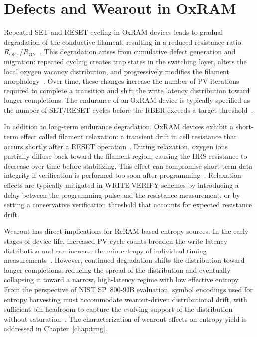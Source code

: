 \section{Defects and Wearout in OxRAM}
\label{sec:bg-defects}

Repeated SET and RESET cycling in OxRAM devices leads to gradual
degradation of the conductive filament, resulting in a reduced
resistance ratio $R_\text{OFF}/R_\text{ON}$~\cite{chen2011physical,
	hayakawa2017resolving}. This degradation arises from cumulative defect
generation and migration: repeated cycling creates trap states in the
switching layer, alters the local oxygen vacancy distribution, and
progressively modifies the filament morphology~\cite{chen2011physical}.
Over time, these changes increase the number of PV iterations required
to complete a transition and shift the write latency distribution toward
longer completions. The endurance of an OxRAM device is typically
specified as the number of SET/RESET cycles before the RBER exceeds a
target threshold~\cite{hayakawa2017resolving,
	fukuyama2019comprehensive}.

In addition to long-term endurance degradation, OxRAM devices exhibit a
short-term effect called filament relaxation: a transient drift in cell
resistance that occurs shortly after a RESET
operation~\cite{li2016short}. During relaxation, oxygen ions partially
diffuse back toward the filament region, causing the HRS resistance to
decrease over time before stabilizing. This effect can compromise
short-term data integrity if verification is performed too soon after
programming~\cite{li2016short}. Relaxation effects are typically
mitigated in WRITE-VERIFY schemes by introducing a delay between the
programming pulse and the resistance measurement, or by setting a
conservative verification threshold that accounts for expected
resistance drift.

Wearout has direct implications for ReRAM-based entropy sources. In the
early stages of device life, increased PV cycle counts broaden the write
latency distribution and can increase the min-entropy of individual
timing measurements~\cite{fukuyama2019comprehensive}. However, continued
degradation shifts the distribution toward longer completions, reducing
the spread of the distribution and eventually collapsing it toward a
narrow, high-latency regime with low effective entropy. From the
perspective of NIST SP~800-90B evaluation, symbol encodings used for
entropy harvesting must accommodate wearout-driven distributional drift,
with sufficient bin headroom to capture the evolving support of the
distribution without saturation~\cite{sonmez2016recommendation}. The
characterization of wearout effects on entropy yield is addressed in
Chapter~\ref{chap:trng}.